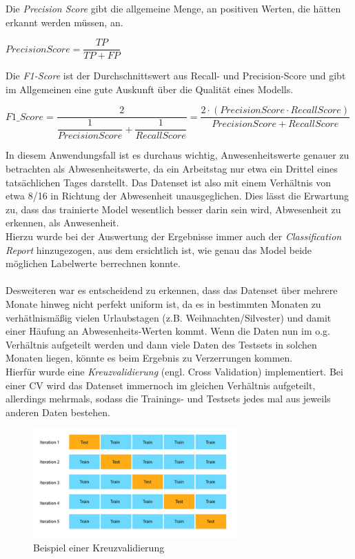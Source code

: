 Die \textit{Precision Score} gibt die allgemeine Menge, an positiven Werten, die hätten erkannt werden müssen,
an.
\begin{center}
    $PrecisionScore = \dfrac{TP}{TP + FP}$    
\end{center}

Die \textit{F1-Score} ist der Durchschnittswert aus Recall- und Precision-Score und gibt im Allgemeinen eine 
gute Auskunft über die Qualität eines Modells.\\

\begin{center}
    $F1\_Score = \dfrac{2}{\dfrac{1}{PrecisionScore} + \dfrac{1}{RecallScore}} = \dfrac{2 \cdot (PrecisionScore \cdot RecallScore)}{PrecisionScore + RecallScore}$    
\end{center}

\vspace{0.75cm}
In diesem Anwendungsfall ist es durchaus wichtig, Anwesenheitswerte genauer zu betrachten als 
Abwesenheitswerte, da ein Arbeitstag nur etwa ein Drittel eines tatsächlichen Tages darstellt. 
Das Datenset ist also mit einem Verhältnis von etwa 8/16 in Richtung der Abwesenheit unausgeglichen. Dies 
lässt die Erwartung zu, dass das trainierte Model wesentlich besser darin sein wird, Abwesenheit zu erkennen,
als Anwesenheit.\\
Hierzu wurde bei der Auswertung der Ergebnisse immer auch der \textit{Classification Report} hinzugezogen,
aus dem ersichtlich ist, wie genau das Model beide möglichen Labelwerte berrechnen konnte.\\\\
Desweiteren war es entscheidend zu erkennen, dass das Datenset über mehrere Monate hinweg nicht perfekt uniform 
ist, da es in bestimmten Monaten zu verhätlnismäßig vielen Urlaubstagen (z.B. Weihnachten/Silvester) und damit 
einer Häufung an Abwesenheits-Werten kommt.
Wenn die Daten nun im o.g. Verhältnis aufgeteilt werden und dann viele Daten des Testsets in solchen Monaten 
liegen, könnte es beim Ergebnis zu Verzerrungen kommen.\\
Hierfür wurde eine \textit{Kreuzvalidierung} (engl. Cross Validation) implementiert. Bei einer CV wird das 
Datenset immernoch im gleichen Verhältnis aufgeteilt, allerdings mehrmals, sodass die Trainings- und Testsets 
jedes mal aus jeweils anderen Daten bestehen.

\begin{figure}[h]
    \centering
    \includegraphics[width=0.7\textwidth]{pic/CV.png}
    \caption{Beispiel einer Kreuzvalidierung}
    \label{fig:CV}
\end{figure}

